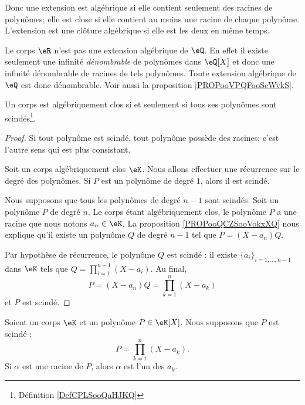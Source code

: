 \begin{normaltext}
	Donc une extension est algébrique si elle contient seulement des racines de polynômes; elle est close si elle contient au moins une racine de chaque polynôme. L'extension est une clôture algébrique si elle est les deux en même temps.
\end{normaltext}

\begin{example}
	Le corps \( \eR\) n'est pas une extension algébrique de \( \eQ\). En effet il existe seulement une infinité \emph{dénombrable} de polynômes dans \( \eQ[X]\) et donc une infinité dénombrable de racines de tels polynômes. Toute extension algébrique de \( \eQ\) est donc dénombrable. Voir aussi la proposition \ref{PROPooVPQFooScWvkS}.
\end{example}

\begin{lemma}       \label{LEMooEYRSooUREeDl}
	Un corps est algébriquement clos si et seulement si tous ses polynômes sont scindés\footnote{Définition \ref{DefCPLSooQaHJKQ}}.
\end{lemma}

\begin{proof}
	Si tout polynôme est scindé, tout polynôme possède des racines; c'est l'autre sens qui est plus consistant.

	Soit un corps algébriquement clos \( \eK\). Nous allons effectuer une récurrence sur le degré des polynômes. Si \( P\) est un polynôme de degré \( 1\), alors il est scindé.

	Nous supposons que tous les polynômes de degré \( n-1\) sont scindés. Soit un polynôme \( P\) de degré \( n\). Le corps étant algébriquement clos, le polynôme \( P\) a une racine que nous notons \( a_n\in \eK\). La proposition \ref{PROPooQCZSooVokxXQ} nous explique qu'il existe un polynôme \( Q\) de degré \( n-1\) tel que \( P=(X-a_n)Q\).

	Par hypothèse de récurrence, le polynôme \( Q\) est scindé : il existe \( \{ a_i \}_{i=1,\ldots, n-1}\) dans \( \eK\) tels que \( Q=\prod_{i=1}^{n-1}(X-a_i)\). Au final,
	\begin{equation}
		P=(X-a_n)Q=\prod_{k=1}^n(X-a_k)
	\end{equation}
	et \( P\) est scindé.
\end{proof}

\begin{lemma}       \label{LEMooYVHKooWhewKp}
	Soient un corps \( \eK\) et un polynôme \( P\in \eK[X]\). Nous supposons que \( P\) est scindé :
	\begin{equation}
		P=\prod_{k=1}^n(X-a_k).
	\end{equation}
	Si \( \alpha\) est une racine de \( P\), alors \( \alpha\) est l'un des \( a_k\).
\end{lemma}

